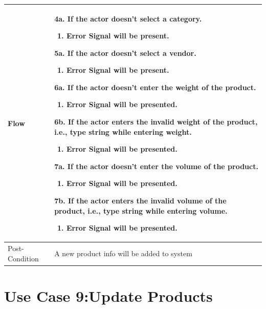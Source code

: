 \documentclass[12pt,a4paper]{report}
\begin{document}
\begin{tabular}{ | m{3cm} | m{12cm}| } \hline
Flow & 4a. If the actor doesn't select a category.
 	\begin{enumerate}
		\item Error Signal will be present.
	\end{enumerate}

5a. If the actor doesn't select a vendor.
 	\begin{enumerate}
		\item Error Signal will be present.
	\end{enumerate}

6a. If the actor doesn't enter the weight of the product.
 	\begin{enumerate}
		\item Error Signal will be presented.
	\end{enumerate}
6b. If the actor enters the invalid weight of the product, i.e., type string while entering weight.
 	\begin{enumerate}
		\item Error Signal will be presented.
	\end{enumerate}
7a. If the actor doesn't enter the volume of the product.
 	\begin{enumerate}
		\item Error Signal will be presented.
	\end{enumerate}
7b. If the actor enters the invalid volume of the product, i.e., type string while entering volume.
 	\begin{enumerate}
		\item Error Signal will be presented.
	\end{enumerate}
\\ \hline
Post-Condition &    A new product info will be added to system\\ \hline

\end{tabular}
\section{Use Case 9:Update Products}
\end{document}

